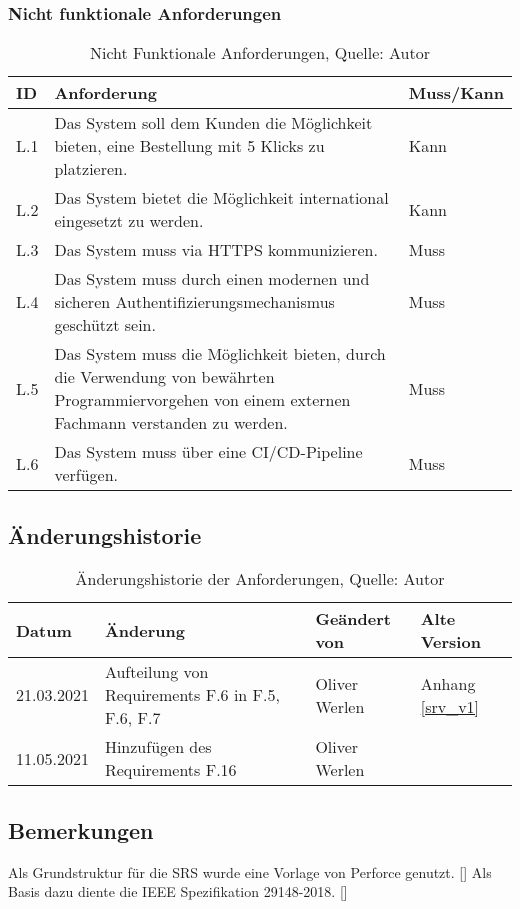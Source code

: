 \subsubsection{Nicht funktionale Anforderungen}
\begin{table}[H]
	\setlength\extrarowheight{2pt} %
	\begin{tabularx}{\textwidth}{|l|X|l|}
		\hline
		\textbf{ID} &  \textbf{Anforderung} & \textbf{Muss/Kann}  \\
        \hline
		L.1 & Das System soll dem Kunden die Möglichkeit bieten, eine Bestellung mit 5 Klicks zu platzieren.  & Kann \\
		\hline
		L.2 & Das System bietet die Möglichkeit international eingesetzt zu werden. & Kann \\
		\hline
		L.3 & Das System muss via HTTPS kommunizieren. & Muss \\
		\hline
		L.4 & Das System muss durch einen modernen und sicheren Authentifizierungsmechanismus geschützt sein. & Muss \\
		\hline
		L.5 & Das System muss die Möglichkeit bieten, durch die Verwendung von bewährten Programmiervorgehen von einem externen Fachmann verstanden zu werden. & Muss \\
		\hline
		L.6 & Das System muss über eine CI/CD-Pipeline verfügen. & Muss \\ 
		\hline
	\end{tabularx}
	\caption{ \label{tbl: NichtFunktionaleAnforderungent}Nicht Funktionale Anforderungen, Quelle: Autor}
\end{table}
\newpage
\subsection{Änderungshistorie}
\begin{table}[H]
	\setlength\extrarowheight{2pt} %
	\begin{tabularx}{\textwidth}{|l|X|l|X|}
		\hline
		\textbf{Datum} &  \textbf{Änderung} & \textbf{Geändert von} & \textbf{Alte Version}  \\
		\hline
		21.03.2021 & Aufteilung von Requirements F.6 in F.5, F.6, F.7  & Oliver Werlen & Anhang \ref{srv_v1}\\
		\hline
		11.05.2021 & Hinzufügen des Requirements F.16  & Oliver Werlen & \\
		\hline
	\end{tabularx}
	\caption{ \label{tbl: historieAnforderungen}Änderungshistorie der Anforderungen, Quelle: Autor}
\end{table}
\subsection{Bemerkungen}
Als Grundstruktur für die SRS wurde eine Vorlage von Perforce genutzt. [\cite{srsdocument}]
Als Basis dazu diente die IEEE Spezifikation 29148-2018. [\cite{ieeeSrs}]
\newpage

